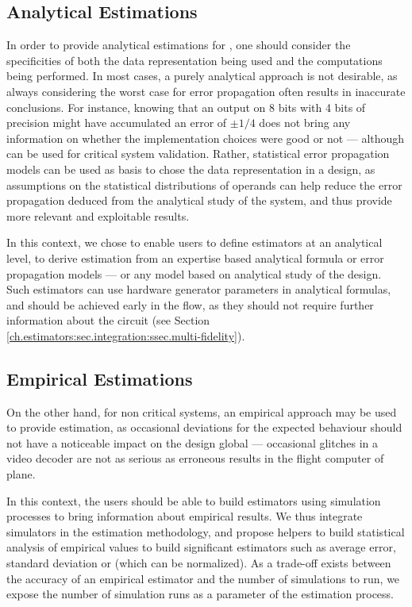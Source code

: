     \subsection{Analytical Estimations}
    \label{ch.estimators:seq.qos:ssec.analytical}

        In order to provide analytical estimations for , one should consider the specificities of both the data representation being used and the computations being performed.
        In most cases, a purely analytical approach is not desirable, as always considering the worst case for error propagation often results in inaccurate conclusions.
        For instance, knowing that an output on 8 bits with 4 bits of precision might have accumulated an error of $\pm 1/4$ does not bring any information on whether the implementation choices were good or not --- although can be used for critical system validation.
        Rather, statistical error propagation models can be used as basis to chose the data representation in a design, as assumptions on the statistical distributions of operands can help reduce the error propagation deduced from the analytical study of the system, and thus provide more relevant and exploitable results.

        In this context, we chose to enable users to define estimators at an analytical level, to derive  estimation from an expertise based analytical formula or error propagation models --- or any model based on analytical study of the design.
        Such estimators can use hardware generator parameters in analytical formulas, and should be achieved early in the flow, as they should not require further information about the circuit (see Section \ref{ch.estimators:sec.integration:ssec.multi-fidelity}).

    \subsection{Empirical Estimations}
    \label{ch.estimators:seq.qos:ssec.empirical}

        On the other hand, for non critical systems, an empirical approach may be used to provide  estimation, as occasional deviations for the expected behaviour should not have a noticeable impact on the design global  --- \eg occasional glitches in a video decoder are not as serious as erroneous results in the flight computer of plane.

\clearpage
        In this context, the users should be able to build estimators using simulation processes to bring information about empirical results.
        We thus integrate simulators in the estimation methodology, and propose helpers to build statistical analysis of empirical values to build significant estimators such as average error, standard deviation or  (which can be normalized).
        As a trade-off exists between the accuracy of an empirical estimator and the number of simulations to run, we expose the number of simulation runs as a parameter of the estimation process.

